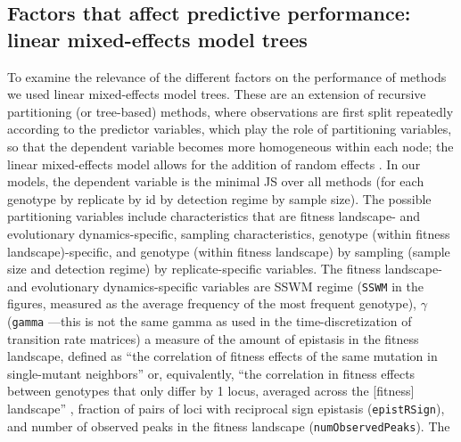 \documentclass[a4paper,10pt]{article}
\begin{document}




\subsection{Factors that affect predictive performance: linear mixed-effects model trees}
\label{sec:linear-mixed-model}

To examine the relevance of the different factors on the performance of
methods we used linear mixed-effects model trees. These are an extension
of recursive partitioning (or tree-based) methods, where observations are
first split repeatedly according to the predictor variables, which play
the role of partitioning variables, so that the dependent variable becomes
more homogeneous within each node; the linear mixed-effects model allows
for the addition of random effects \cite{fokkema2018, fokkema2020}. In our
models, the dependent variable is the minimal JS over all methods (for
each genotype by replicate by id by detection regime by sample size).  The
possible partitioning variables include characteristics that are fitness
landscape- and evolutionary dynamics-specific, sampling characteristics,
genotype (within fitness landscape)-specific, and genotype (within fitness
landscape) by sampling (sample size and detection regime) by
replicate-specific variables.  The fitness landscape- and evolutionary
dynamics-specific variables are %
SSWM regime (\texttt{SSWM} in the figures, measured as the average frequency of the
most frequent genotype), %
$\gamma$ (\texttt{gamma} ---this is not the same gamma as used in the
time-discretization of transition rate matrices) a measure of the amount
of epistasis in the fitness landscape, defined as ``the correlation of
fitness effects of the same mutation in single-mutant neighbors''
\cite{ferretti_measuring_2016} or, equivalently, ``the correlation in
fitness effects between genotypes that only differ by 1 locus, averaged
across the [fitness] landscape'' \cite{brouillet_magellan:_2015}, fraction
of pairs of loci with reciprocal sign epistasis (\texttt{epistRSign}), and number
of observed peaks in the fitness landscape (\texttt{numObservedPeaks}). The
\end{document}

